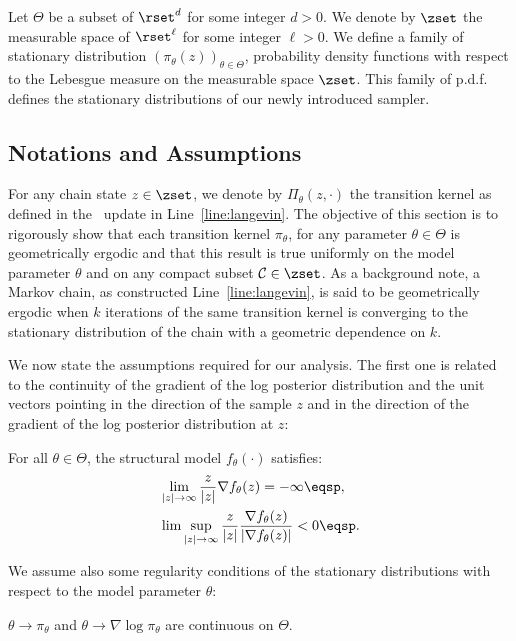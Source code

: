 \documentclass[letterpaper]{article} %
\begin{document}
Let $\Theta$ be a subset of $\rset^d$ for some integer $d >0$.
We denote by $\zset$ the measurable space of $\rset^\ell$ for some integer $\ell >0$.
We define a family of stationary distribution $\left(\pi_\theta(z) \right)_{\theta \in \Theta}$, probability density functions with respect to the Lebesgue measure on the measurable space $\zset$. This family of p.d.f. defines the stationary distributions of our newly introduced sampler.

\subsection{Notations and Assumptions}
For any chain state $z \in \zset$, we denote by $\Pi_\theta(z,\cdot)$ the transition kernel as defined in the \algo\ update in Line~\ref{line:langevin}.
The objective of this section is to rigorously show that each transition kernel $\pi_\theta$, for any parameter $\theta \in \Theta$ is geometrically ergodic and that this result is true uniformly on the model parameter $\theta$ and on any compact subset $\mathcal{C} \in \zset$.
As a background note, a Markov chain, as constructed Line~\ref{line:langevin}, is said to be geometrically ergodic when $k$ iterations of the same transition kernel is converging to the stationary distribution of the chain with a geometric dependence on $k$.

We now state the assumptions required for our analysis.
The first one is related to the continuity of the gradient of the log posterior distribution and the unit vectors pointing in the direction of the sample $z$ and in the direction of the gradient of the log posterior distribution at $z$:
\begin{assumption}\label{ass:bounded}
For all $\theta \in \Theta$, the structural model $f_\theta(\cdot)$ satisfies:
\begin{equation}\notag
\begin{split}
&\lim \limits_{|z| \to \infty} \frac{z}{|z|} \nabla f_{\theta}(z)  = - \infty \eqsp,\\
 &\lim \sup \limits_{|z| \to \infty} \frac{z}{|z|} \frac{\nabla f_{\theta}(z) }{|\nabla f_{\theta}(z) |} < 0 \eqsp.
\end{split}
\end{equation}
\end{assumption}

We assume also some regularity conditions of the stationary distributions with respect to the model parameter $\theta$:
\begin{assumption}\label{ass:contlogpi}
$\theta \to \pi_\theta$ and $\theta \to \nabla \log \pi_\theta$ are continuous on $\Theta$.
\end{assumption}
\end{document}
